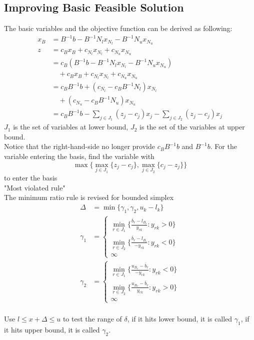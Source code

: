 			\subsection{Improving Basic Feasible Solution}
				The basic variables and the objective function can be derived as following:
				\begin{align}
					x_B &= B^{-1}b - B^{-1}N_lx_{N_l} - B^{-1}N_ux_{N_u} \\
					  z &= c_Bx_B + c_{N_l}x_{N_l} + c_{N_u}x_{N_u} \\
					  	&= c_B(B^{-1}b - B^{-1}N_lx_{N_l} - B^{-1}N_ux_{N_u})  \\
					  	& \quad + c_Bx_B + c_{N_l}x_{N_l} + c_{N_u}x_{N_u}\\
					  	&= c_BB^{-1}b + (c_{N_l} - c_BB^{-1}N_l)x_{N_l} \\
					  	& \quad + (c_{N_u} - c_BB^{-1}N_u)x_{N_u} \\
					  	&= c_BB^{-1}b - \sum_{j \in J_1}(z_j - c_j)x_j - \sum_{j \in J_2}(z_j - c_j)x_j
				\end{align}
				$J_1$ is the set of variables at lower bound, $J_2$ is the set of the variables at upper bound.\\
				Notice that the right-hand-side no longer provide $c_BB^{-1}b$ and $B^{-1}b$. For the variable entering the basis, find the variable with
				\begin{equation}
					\max\{\max_{j\in J_1}\{z_j - c_j\}, \max_{j\in J_2}\{c_j - z_j\}\} 
				\end{equation}
				to enter the basis\\
				 "Most violated rule"\\
				The minimum ratio rule is revised for bounded simplex
				\begin{align}
					\Delta &= \min \{\gamma_1, \gamma_2, u_k-l_k\} \\
					\gamma_1 &= \begin{cases}
									\min_{r\in J_1}\{\frac{\bar{b}_r-l_{B_r}}{y_{rk}}:y_{rk} > 0\} \\
									\min_{r\in J_2}\{\frac{\bar{b}_r-l_{B_r}}{-y_{rk}}:y_{rk} < 0\} \\
									\infty
								\end{cases} \\
					\gamma_2 &= \begin{cases}
									\min_{r\in J_1}\{\frac{u_{B_r} - \bar{b}_r}{-y_{rk}}:y_{rk} < 0\} \\
									\min_{r\in J_2}\{\frac{u_{B_r} - \bar{b}_r}{y_{rk}}:y_{rk} > 0\} \\
									\infty
								\end{cases} 
				\end{align}
				\\
				Use $l \le x+\Delta \le u$ to test the range of $\delta$, if it hits lower bound, it is called $\gamma_1$, if it hits upper bound, it is called $\gamma_2$.

